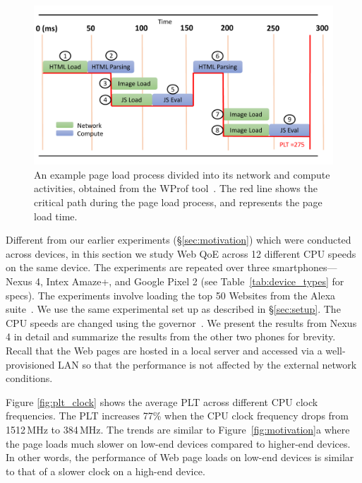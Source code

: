 \begin{figure}[t]
  \centering
  \includegraphics[width=\linewidth]{sections/device-work/wprof-dp.pdf}
    \caption{An example page load process divided into its network and compute activities, obtained from the WProf tool~\cite{wang2013demystifying,nejati2016depth}. The red line shows the critical path during the page load process, and represents the page load time. }
  \label{fig:wprof-dp}
\end{figure}

Different from our earlier experiments (\S\ref{sec:motivation}) which were conducted across devices, in this section we study Web QoE  across 12 different CPU speeds on the same device. The experiments are repeated over three smartphones---Nexus 4, Intex Amaze+, and Google Pixel 2 (see Table~\ref{tab:device_types} for specs). The experiments involve loading the top 50 Websites from the Alexa suite~\cite{alexa}.  We use the 
same experimental set up as described in \S\ref{sec:setup}. The CPU speeds are changed using the governor~\cite{ad-governors}. We present the results from Nexus\,4 in detail and summarize the results from the other two phones for brevity.
%
Recall that the Web pages are hosted in a local server and accessed via a well-provisioned LAN so that the performance is not affected by the external network conditions. 


Figure \ref{fig:plt_clock} shows the average PLT across different CPU clock frequencies. The PLT increases 77\% when the CPU clock frequency drops from 1512\,MHz to 384\,MHz. The trends are similar to Figure~\ref{fig:motivation}a where the page loads much slower on low-end devices compared to higher-end devices. In other words, the performance of Web page loads on low-end devices is similar to that of a slower clock on a high-end device. 


